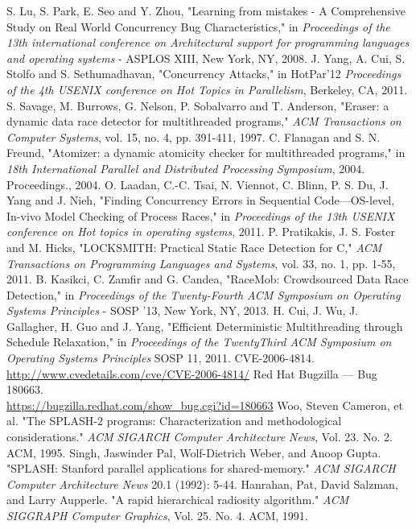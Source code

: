 \documentclass[letterpaper,twocolumn,10pt]{article}
\begin{document}

\begin{thebibliography}{13}
S. Lu, S. Park, E. Seo and Y. Zhou, "Learning from mistakes - A Comprehensive Study on Real World Concurrency Bug Characteristics," in \emph{Proceedings of the 13th international conference on Architectural support for programming languages and operating systems} - ASPLOS XIII, New York, NY, 2008.
J. Yang, A. Cui, S. Stolfo and S. Sethumadhavan, "Concurrency Attacks," in HotPar'12 \emph{Proceedings of the 4th USENIX conference on Hot Topics in Parallelism}, Berkeley, CA, 2011.
S. Savage, M. Burrows, G. Nelson, P. Sobalvarro and T. Anderson, "Eraser: a dynamic data race detector for multithreaded programs," \emph{ACM Transactions on Computer Systems}, vol. 15, no. 4, pp. 391-411, 1997.
C. Flanagan and S. N. Freund, "Atomizer: a dynamic atomicity checker for multithreaded programs," in \emph{18th International Parallel and Distributed Processing Symposium}, 2004. Proceedings., 2004.
O. Laadan, C.-C. Tsai, N. Viennot, C. Blinn, P. S. Du, J. Yang and J. Nieh, "Finding Concurrency Errors in Sequential Code—OS-level, In-vivo Model Checking of Process Races," in \emph{Proceedings of the 13th USENIX conference on Hot topics in operating systems}, 2011.
P. Pratikakis, J. S. Foster and M. Hicks, "LOCKSMITH: Practical Static Race Detection for C," \emph{ACM Transactions on Programming Languages and Systems}, vol. 33, no. 1, pp. 1-55, 2011.
B. Kasikci, C. Zamfir and G. Candea, "RaceMob: Crowdsourced Data Race Detection," in \emph{Proceedings of the Twenty-Fourth ACM Symposium on Operating Systems Principles} - SOSP '13, New York, NY, 2013.
H. Cui, J. Wu, J. Gallagher, H. Guo and J. Yang, "Efficient Deterministic Multithreading through Schedule Relaxation," in \emph{Proceedings of the TwentyThird ACM Symposium on Operating Systems Principles} SOSP 11, 2011.
CVE-2006-4814. \url{http://www.cvedetails.com/cve/CVE-2006-4814/}
Red Hat Bugzilla --- Bug 180663.\\\url{https://bugzilla.redhat.com/show_bug.cgi?id=180663}
Woo, Steven Cameron, et al. "The SPLASH-2 programs: Characterization and methodological considerations." \emph{ACM SIGARCH Computer Architecture News}, Vol. 23. No. 2. ACM, 1995.
Singh, Jaswinder Pal, Wolf-Dietrich Weber, and Anoop Gupta. "SPLASH: Stanford parallel applications for shared-memory." \emph{ACM SIGARCH Computer Architecture News} 20.1 (1992): 5-44.
Hanrahan, Pat, David Salzman, and Larry Aupperle. "A rapid hierarchical radiosity algorithm." \emph{ACM SIGGRAPH Computer Graphics}, Vol. 25. No. 4. ACM, 1991.
\end{thebibliography}

\end{document}
